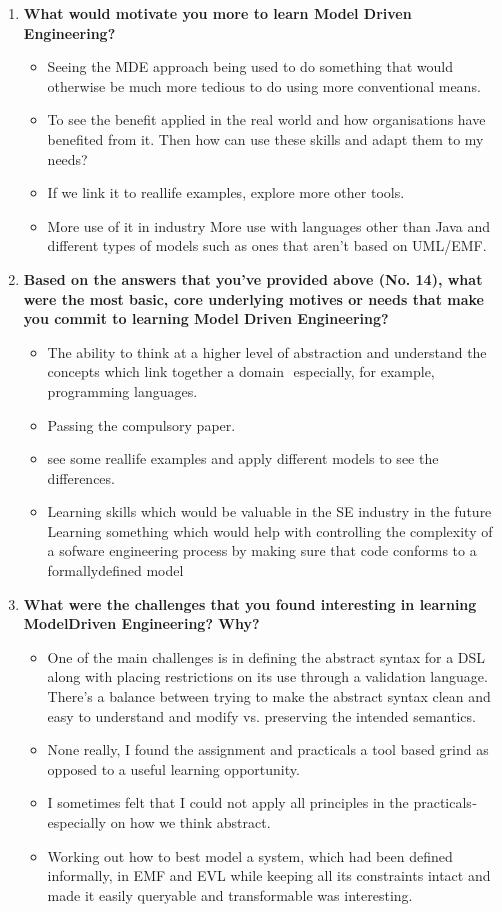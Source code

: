 \documentclass[12pt, a4paper]{report}
\begin{document}
\begin{appendices}
\begin{enumerate}
\item \textbf{ What would motivate you more to learn Model Driven Engineering?}
\begin{itemize}
\item Seeing the MDE approach being used to do something that would otherwise be much more tedious to do using more conventional means.
\item To see the benefit applied in the real world and how organisations have benefited from it. Then how can use these skills and adapt them to my needs?
\item If we link it to real­life examples, explore more other tools.
\item More use of it in industry More use with languages other than Java and different types of models such as ones that aren't based on UML/EMF.
\end{itemize}

\item \textbf{ Based on the answers that you’ve provided above (No. 1­4), what were the most basic, core underlying motives or needs that make you commit to learning Model­
Driven Engineering?}

\begin{itemize}
\item The ability to think at a higher level of abstraction and understand the concepts which link together a domain ­ especially, for example, programming languages. 
\item Passing the compulsory paper.
\item see some real­life examples and apply different models to see the differences. 
\item Learning skills which would be valuable in the SE industry in the future Learning something which would help with controlling the complexity of a sofware engineering process by making sure that code
conforms to a formally­defined model
\end{itemize}


\item \textbf{ What were the challenges that you found interesting in learning Model­Driven Engineering? Why?}
\begin{itemize}
\item One of the main challenges is in defining the abstract syntax for a DSL along with placing restrictions on its use through a validation language. There's a balance between trying to make the abstract syntax clean and easy to understand and modify vs. preserving the intended semantics.
\item None really, I found the assignment and practicals a tool based grind as opposed to a useful learning opportunity.
\item I sometimes felt that I could not apply all principles in the practicals­ especially on how we think abstract.
\item Working out how to best model a system, which had been defined informally, in EMF and EVL while keeping all its constraints intact and made it easily queryable and transformable was interesting.
\end{itemize}




\end{enumerate}
\end{appendices}
\end{document}
